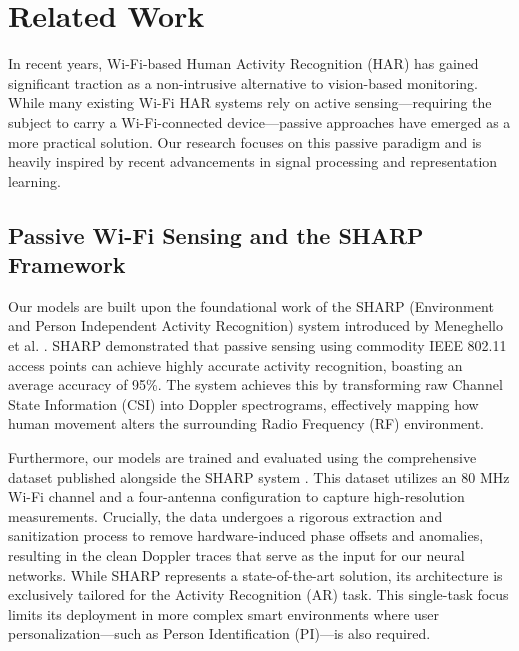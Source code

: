 
\section{Related Work}
\label{sec:related_work}

In recent years, Wi-Fi-based Human Activity Recognition (HAR) has gained significant traction as a non-intrusive alternative to vision-based monitoring. While many existing Wi-Fi HAR systems rely on active sensing—requiring the subject to carry a Wi-Fi-connected device—passive approaches have emerged as a more practical solution. Our research focuses on this passive paradigm and is heavily inspired by recent advancements in signal processing and representation learning.

\subsection{Passive Wi-Fi Sensing and the SHARP Framework}
Our models are built upon the foundational work of the SHARP (Environment and Person Independent Activity Recognition) system introduced by Meneghello et al. \cite{sharp}. SHARP demonstrated that passive sensing using commodity IEEE 802.11 access points can achieve highly accurate activity recognition, boasting an average accuracy of 95\%. The system achieves this by transforming raw Channel State Information (CSI) into Doppler spectrograms, effectively mapping how human movement alters the surrounding Radio Frequency (RF) environment.

Furthermore, our models are trained and evaluated using the comprehensive dataset published alongside the SHARP system \cite{data, dataset}. This dataset utilizes an 80 MHz Wi-Fi channel and a four-antenna configuration to capture high-resolution measurements. Crucially, the data undergoes a rigorous extraction and sanitization process to remove hardware-induced phase offsets and anomalies, resulting in the clean Doppler traces that serve as the input for our neural networks.
While SHARP represents a state-of-the-art solution, its architecture is exclusively tailored for the Activity Recognition (AR) task. This single-task focus limits its deployment in more complex smart environments where user personalization—such as Person Identification (PI)—is also required.

